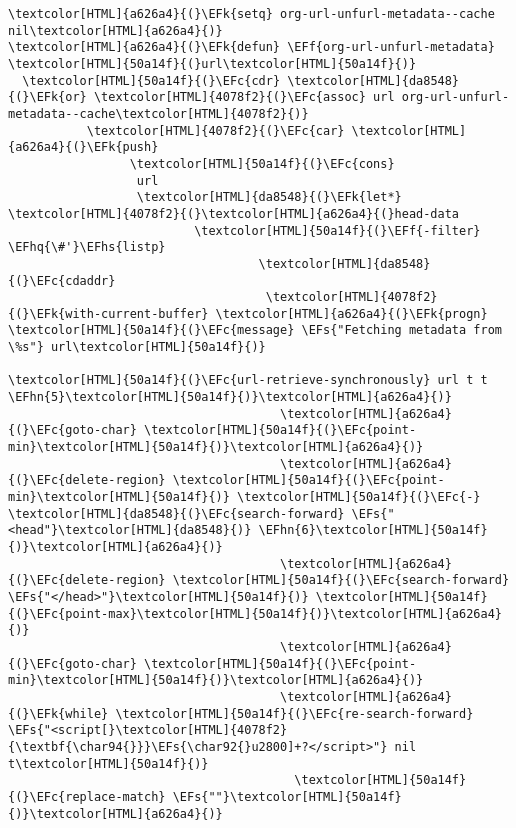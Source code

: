 \documentclass{scrartcl}
\newcommand{\EFk}[1]{\textcolor{EFk}{#1}} %
\newcommand{\EFs}[1]{\textcolor{EFs}{#1}} %
\newcommand{\EFc}[1]{\textcolor{EFc}{#1}} %
\newcommand{\EFf}[1]{\textcolor{EFf}{#1}} %
\newcommand{\EFhn}[1]{\textcolor{EFhn}{\textbf{#1}}} %
\newcommand{\EFhq}[1]{\textcolor{EFhq}{#1}} %
\newcommand{\EFhs}[1]{\textcolor{EFhs}{#1}} %
\begin{document}
\begin{Code}
\begin{Verbatim}[]
\textcolor[HTML]{a626a4}{(}\EFk{setq} org-url-unfurl-metadata--cache nil\textcolor[HTML]{a626a4}{)}
\textcolor[HTML]{a626a4}{(}\EFk{defun} \EFf{org-url-unfurl-metadata} \textcolor[HTML]{50a14f}{(}url\textcolor[HTML]{50a14f}{)}
  \textcolor[HTML]{50a14f}{(}\EFc{cdr} \textcolor[HTML]{da8548}{(}\EFk{or} \textcolor[HTML]{4078f2}{(}\EFc{assoc} url org-url-unfurl-metadata--cache\textcolor[HTML]{4078f2}{)}
           \textcolor[HTML]{4078f2}{(}\EFc{car} \textcolor[HTML]{a626a4}{(}\EFk{push}
                 \textcolor[HTML]{50a14f}{(}\EFc{cons}
                  url
                  \textcolor[HTML]{da8548}{(}\EFk{let*} \textcolor[HTML]{4078f2}{(}\textcolor[HTML]{a626a4}{(}head-data
                          \textcolor[HTML]{50a14f}{(}\EFf{-filter} \EFhq{\#'}\EFhs{listp}
                                   \textcolor[HTML]{da8548}{(}\EFc{cdaddr}
                                    \textcolor[HTML]{4078f2}{(}\EFk{with-current-buffer} \textcolor[HTML]{a626a4}{(}\EFk{progn} \textcolor[HTML]{50a14f}{(}\EFc{message} \EFs{"Fetching metadata from \%s"} url\textcolor[HTML]{50a14f}{)}
                                                                \textcolor[HTML]{50a14f}{(}\EFc{url-retrieve-synchronously} url t t \EFhn{5}\textcolor[HTML]{50a14f}{)}\textcolor[HTML]{a626a4}{)}
                                      \textcolor[HTML]{a626a4}{(}\EFc{goto-char} \textcolor[HTML]{50a14f}{(}\EFc{point-min}\textcolor[HTML]{50a14f}{)}\textcolor[HTML]{a626a4}{)}
                                      \textcolor[HTML]{a626a4}{(}\EFc{delete-region} \textcolor[HTML]{50a14f}{(}\EFc{point-min}\textcolor[HTML]{50a14f}{)} \textcolor[HTML]{50a14f}{(}\EFc{-} \textcolor[HTML]{da8548}{(}\EFc{search-forward} \EFs{"<head"}\textcolor[HTML]{da8548}{)} \EFhn{6}\textcolor[HTML]{50a14f}{)}\textcolor[HTML]{a626a4}{)}
                                      \textcolor[HTML]{a626a4}{(}\EFc{delete-region} \textcolor[HTML]{50a14f}{(}\EFc{search-forward} \EFs{"</head>"}\textcolor[HTML]{50a14f}{)} \textcolor[HTML]{50a14f}{(}\EFc{point-max}\textcolor[HTML]{50a14f}{)}\textcolor[HTML]{a626a4}{)}
                                      \textcolor[HTML]{a626a4}{(}\EFc{goto-char} \textcolor[HTML]{50a14f}{(}\EFc{point-min}\textcolor[HTML]{50a14f}{)}\textcolor[HTML]{a626a4}{)}
                                      \textcolor[HTML]{a626a4}{(}\EFk{while} \textcolor[HTML]{50a14f}{(}\EFc{re-search-forward} \EFs{"<script[}\textcolor[HTML]{4078f2}{\textbf{\char94{}}}\EFs{\char92{}u2800]+?</script>"} nil t\textcolor[HTML]{50a14f}{)}
                                        \textcolor[HTML]{50a14f}{(}\EFc{replace-match} \EFs{""}\textcolor[HTML]{50a14f}{)}\textcolor[HTML]{a626a4}{)}

\end{Verbatim}
\end{Code}
\end{document}

